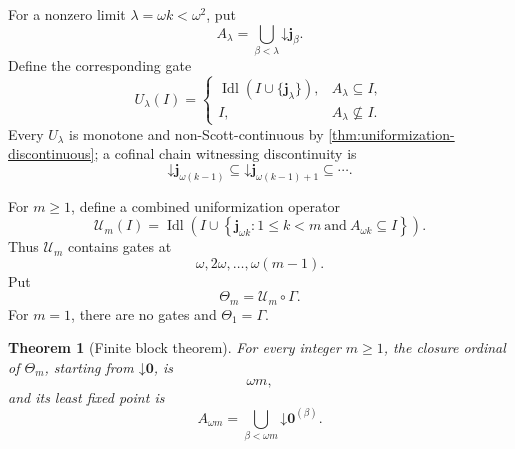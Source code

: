 \documentclass[11pt]{article}
\newtheorem{theorem}{Theorem}[section]
\theoremstyle{definition}
\theoremstyle{remark}
\newcommand{\down}{\mathord{\downarrow}}
\begin{document}
For a nonzero limit $\lambda=\omega k<\omega^2$, put
\begin{equation}
A_\lambda
=
\bigcup_{\beta<\lambda}\down\mathbf j_\beta.
\label{eq:A-lambda}
\end{equation}
Define the corresponding gate
\begin{equation}
U_\lambda(I)
=
\begin{cases}
\operatorname{Idl}(I\cup\{\mathbf j_\lambda\}),&A_\lambda\subseteq I,\\[3pt]
I,&A_\lambda\nsubseteq I.
\end{cases}
\label{eq:U-lambda}
\end{equation}
Every $U_\lambda$ is monotone and non-Scott-continuous by \cref{thm:uniformization-discontinuous}; a cofinal chain witnessing discontinuity is
\[
\down\mathbf j_{\omega(k-1)}
\subseteq
\down\mathbf j_{\omega(k-1)+1}
\subseteq\cdots.
\]

For $m\geq1$, define a combined uniformization operator
\begin{equation}
\mathcal U_m(I)
=
\operatorname{Idl}\!\left(
I\cup
\left\{
\mathbf j_{\omega k}:
1\leq k<m
\ \text{and}\ 
A_{\omega k}\subseteq I
\right\}
\right).
\label{eq:Um}
\end{equation}
Thus $\mathcal U_m$ contains gates at
\[
\omega,2\omega,\ldots,\omega(m-1).
\]
Put
\begin{equation}
\Theta_m=\mathcal U_m\circ\Gamma.
\label{eq:Thetam}
\end{equation}
For $m=1$, there are no gates and $\Theta_1=\Gamma$.

\begin{theorem}[Finite block theorem]
\label{thm:finite-block}
For every integer $m\geq1$, the closure ordinal of $\Theta_m$, starting from $\down\mathbf0$, is
\[
\omega m,
\]
and its least fixed point is
\begin{equation}
A_{\omega m}
=
\bigcup_{\beta<\omega m}\down\mathbf0^{(\beta)}.
\label{eq:A-omegam}
\end{equation}
\end{theorem}
\end{document}
